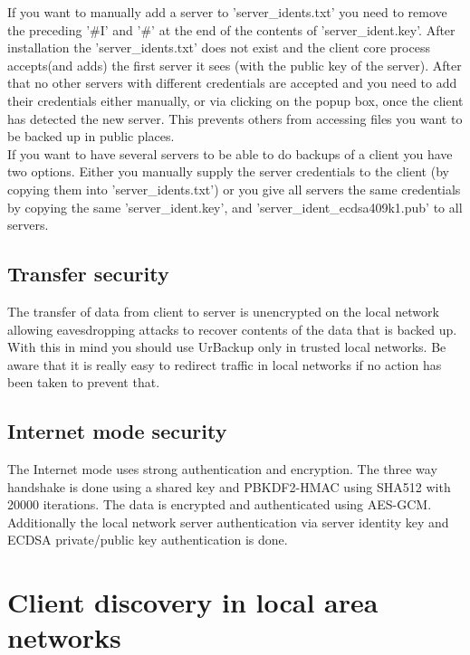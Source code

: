 \documentclass[a4paper,10pt]{article}
\begin{document}
If you want to manually add a server to 'server\_idents.txt' you need to remove the preceding '\#I' and '\#' at the end of the contents of 'server\_ident.key'. After installation the 'server\_idents.txt' does not exist and the client core process accepts(and adds) the first server it sees (with the public key of the server). After that no other servers with different credentials are accepted and you need to add their credentials either manually, or via clicking on the popup box, once the client has detected the new server. This prevents others from accessing files you want to be backed up in public places.\\
If you want to have several servers to be able to do backups of a client you have two options. Either you manually supply the server credentials to the client (by copying them into 'server\_idents.txt') or you give all servers the same credentials by copying the same 'server\_ident.key',  and 'server\_ident\_ecdsa409k1.pub' to all servers.

\subsection{Transfer security}

The transfer of data from client to server is unencrypted on the local
network allowing eavesdropping attacks to recover contents of the data that is
backed up. With this in mind you should use UrBackup only in trusted local
networks. Be aware that it is really easy to redirect traffic in local networks if no action has been taken to prevent that.

\subsection{Internet mode security}

The Internet mode uses strong authentication and encryption. The three way
handshake is done using a shared key and PBKDF2-HMAC using SHA512 with 20000
iterations. The data is encrypted and authenticated using AES-GCM. Additionally the local network server authentication via server identity key and ECDSA private/public key authentication is done.


\section{Client discovery in local area networks}
\label{client_discovery}
\end{document}
